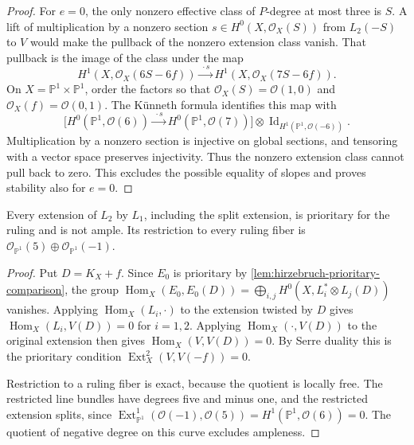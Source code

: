 \begin{proof}
For $e=0$, the only nonzero effective class of $P$-degree at most three is $S$. A lift of multiplication by a nonzero section $s\in H^0(X,\mathcal O_X(S))$ from $L_2(-S)$ to $V$ would make the pullback of the nonzero extension class vanish. That pullback is the image of the class under the map
\[
 H^1(X,\mathcal O_X(6S-6f))
 \xrightarrow{\ \cdot s\ }H^1(X,\mathcal O_X(7S-6f)).
\]
On $X=\mathbb P^1\times\mathbb P^1$, order the factors so that $\mathcal O_X(S)=\mathcal O(1,0)$ and $\mathcal O_X(f)=\mathcal O(0,1)$. The K\"unneth formula identifies this map with
\[
 \bigl[H^0(\mathbb P^1,\mathcal O(6))
 \xrightarrow{\ \cdot s\ }H^0(\mathbb P^1,\mathcal O(7))\bigr]
 \otimes\operatorname{Id}_{H^1(\mathbb P^1,\mathcal O(-6))}.
\]
Multiplication by a nonzero section is injective on global sections, and tensoring with a vector space preserves injectivity. Thus the nonzero extension class cannot pull back to zero. This excludes the possible equality of slopes and proves stability also for $e=0$.
\end{proof}

\begin{proposition}\label{prop:hirzebruch-extension-prioritary}
Every extension of $L_2$ by $L_1$, including the split extension, is prioritary for the ruling and is not ample. Its restriction to every ruling fiber is $\mathcal O_{\mathbb P^1}(5)\oplus\mathcal O_{\mathbb P^1}(-1)$.
\end{proposition}
\begin{proof}
Put $D=K_X+f$. Since $E_0$ is prioritary by \cref{lem:hirzebruch-prioritary-comparison}, the group $\operatorname{Hom}_X(E_0,E_0(D))=\bigoplus_{i,j}H^0(X,L_i^*\otimes L_j(D))$ vanishes. Applying $\operatorname{Hom}_X(L_i,\cdot)$ to the extension twisted by $D$ gives $\operatorname{Hom}_X(L_i,V(D))=0$ for $i=1,2$. Applying $\operatorname{Hom}_X(\cdot,V(D))$ to the original extension then gives $\operatorname{Hom}_X(V,V(D))=0$. By Serre duality this is the prioritary condition $\operatorname{Ext}^2_X(V,V(-f))=0$.

Restriction to a ruling fiber is exact, because the quotient is locally free. The restricted line bundles have degrees five and minus one, and the restricted extension splits, since
$\operatorname{Ext}^1_{\mathbb P^1}(\mathcal O(-1),\mathcal O(5))
=H^1(\mathbb P^1,\mathcal O(6))=0$.
The quotient of negative degree on this curve excludes ampleness.
\end{proof}

